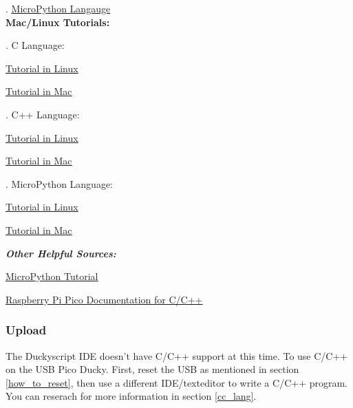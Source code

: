 \documentclass[a4paper,12pt]{article}
\begin{document}
\indent{}. \underline{\href{https://how2electronics.com/raspberry-pi-pico-getting-started-tutorial-with-micropython/}{MicroPython Langauge}}\\

\textbf{Mac/Linux Tutorials:}

\indent{}. C Language:
\begin{description}
	\setlength{\itemindent}{3em}
	\item[$\bullet$] \underline{\href{https://www.electronicshub.org/program-raspberry-pi-pico-using-c/}{Tutorial in Linux}}
	\item[$\bullet$] \underline{\href{https://blog.smittytone.net/2021/02/02/program-raspberry-pi-pico-c-mac/}{Tutorial in Mac}}
\end{description}

\indent{}. C++ Language:
\begin{description}
	\setlength{\itemindent}{3em}
	\item[$\bullet$]\underline{\href{https://circuitdigest.com/microcontroller-projects/how-to-program-raspberry-pi-pico-using-c}{Tutorial in Linux}}
	\item[$\bullet$]\underline{\href{https://www.peterzimon.com/raspberry-pi-pico-mac-c-getting-started/}{Tutorial in Mac}}
\end{description}

\indent{}. MicroPython Language:
\begin{description}
	\setlength{\itemindent}{3em}
	\item[$\bullet$]\underline{\href{https://circuitdigest.com/microcontroller-projects/getting-started-with-raspberry-pi-pico-with-micropython}{Tutorial in Linux}}
	\item[$\bullet$]\underline{\href{https://desertbot.io/blog/raspberry-pi-pico-setup-mac}{Tutorial in Mac}}
\end{description}

\large
\emph{\textbf{Other Helpful Sources:}}
\normalsize
\begin{description}
	\setlength{\itemindent}{3em}
	\item[$\bullet$] \underline{\href{https://how2electronics.com/raspberry-pi-pico-getting-started-tutorial-with-micropython/}{MicroPython Tutorial}}
	\item[$\bullet$] \underline{\href{https://www.raspberrypi.com/documentation/microcontrollers/c_sdk.html}{Raspberry Pi Pico Documentation for C/C++}}
\end{description}

\subsubsection{Upload}

The Duckyscript IDE doesn't have C/C++ support at this time. To use C/C++ on the USB Pico Ducky. First, reset the USB as mentioned in section \ref{how_to_reset}, then use a different IDE/texteditor to write a C/C++ program. You can reserach for more information in section \ref{cc_lang}.

\newpage
\end{document}
